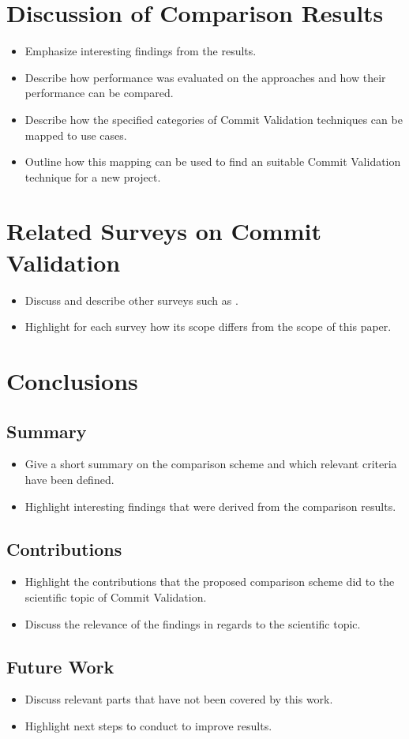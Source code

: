 \section{Discussion of Comparison Results}
\label{sec:discussion}
\begin{itemize}
	\item Emphasize interesting findings from the results.
	\item Describe how performance was evaluated on the approaches and how their performance can be compared.
	\item Describe how the specified categories of Commit Validation techniques can be mapped to use cases.
	\item Outline how this mapping can be used to find an suitable Commit Validation technique for a new project.
\end{itemize}


\section{Related Surveys on Commit Validation}
\label{sec:relatedsurveys}
\begin{itemize}
	\item Discuss and describe other surveys such as \cite{Kim2008,Catolino2019,Syed2019,Yang2016}.
	\item Highlight for each survey how its scope differs from the scope of this paper.
\end{itemize}


\section{Conclusions}
\label{sec:conclusions}

\subsection{Summary}
\begin{itemize}
	\item Give a short summary on the comparison scheme and which relevant criteria have been defined.
	\item Highlight interesting findings that were derived from the comparison results.
\end{itemize}

\subsection{Contributions}
\begin{itemize}
	\item Highlight the contributions that the proposed comparison scheme did to the scientific topic of Commit Validation.
	\item Discuss the relevance of the findings in regards to the scientific topic.
\end{itemize}

\subsection{Future Work}
\begin{itemize}
	\item Discuss relevant parts that have not been covered by this work.
	\item Highlight next steps to conduct to improve results.
\end{itemize}
